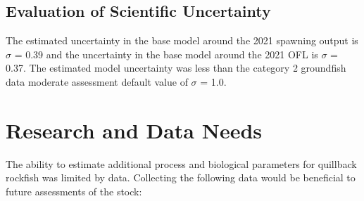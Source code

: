 \documentclass[11pt,
  english,
  a4paper,
]{article}
\begin{document}
\leavevmode\tagmcend\tagstructend\par


\hypertarget{evaluation-of-scientific-uncertainty}{%
\subsection{Evaluation of Scientific Uncertainty}\label{evaluation-of-scientific-uncertainty}}

\leavevmode\tagmcend\tagstructend


The estimated uncertainty in the base model around the 2021 spawning output is {\(\sigma\)\leavevmode\tagmcend\tagstructend} = 0.39 and the uncertainty in the base model around the 2021 OFL is {\(\sigma\)\leavevmode\tagmcend\tagstructend} = 0.37. The estimated model uncertainty was less than the category 2 groundfish data moderate assessment default value of {\(\sigma\)\leavevmode\tagmcend\tagstructend} = 1.0.

\leavevmode\tagmcend\tagstructend\par


\hypertarget{research-and-data-needs}{%
\section{Research and Data Needs}\label{research-and-data-needs}}

\leavevmode\tagmcend\tagstructend


The ability to estimate additional process and biological parameters for quillback rockfish was limited by data. Collecting the following data would be beneficial to future assessments of the stock:

\leavevmode\tagmcend\tagstructend\par
\end{document}
